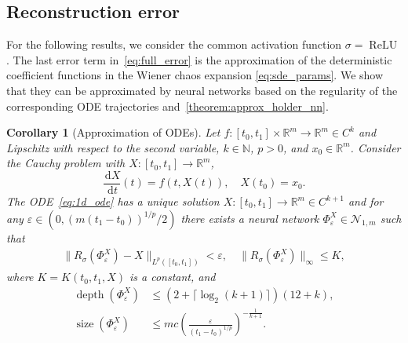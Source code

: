\documentclass[12pt]{article}
\newtheorem{corollary}[theorem]{Corollary}
\theoremstyle{remark}
\theoremstyle{plain}
\numberwithin{equation}{section}
\newcommand{\dd}{\ensuremath{\,\mathrm d}}
\newcommand{\N}{\mathbb{N}}
\newcommand{\R}{\mathbb{R}}
\DeclareMathOperator{\Size}{size}
\DeclareMathOperator{\Depth}{depth}
\DeclareMathOperator{\ReLU}{ReLU}
\begin{document}
\subsection{Reconstruction error}
\label{sec:reconstruction error}

For the following results, we consider the common activation function $\sigma=\ReLU$.
The last error term in~\cref{eq:full_error} is the approximation of the deterministic coefficient functions in the Wiener chaos expansion \cref{eq:sde_params}.
We show that they can be approximated by neural networks based on the regularity of the corresponding ODE trajectories and~\cref{theorem:approx_holder_nn}.
\begin{corollary}[{Approximation of ODEs}]\label{corollary:approx_1d_odes}
    Let $f : [t_0,t_1] \times \R^m \to \R^m \in C^k$ and Lipschitz with respect to the second variable, $k \in \N$, $p > 0$, and $x_0 \in \R^m$.
    Consider the Cauchy problem with $X : [t_0, t_1] \to \R^m$,
    \begin{equation}
        \frac{\dd X}{\dd t}(t) = f(t, X(t)),\quad X(t_0)=x_0.\label{eq:1d_ode}
    \end{equation}
    The ODE~\cref{eq:1d_ode} has a unique solution $X : [t_0,t_1] \to \R^m \in C^{k+1}$ and for any $\varepsilon \in (0,(m(t_1-t_0))^{1/p}/2)$ there exists a neural network $\Phi_\varepsilon^X \in \mathcal N_{1,m}$ such that
    \begin{align*}
        \|R_\sigma(\Phi_\varepsilon^X) - X\|_{L^p([t_0,t_1])} < \varepsilon,\quad
        \|R_\sigma(\Phi_\varepsilon^X)\|_\infty \leq K,
    \end{align*}
    where $K = K(t_0, t_1, X)$ is a constant, and
    \begin{align*}
        \Depth(\Phi_\varepsilon^X) &\leq (2+\lceil \log_2(k+1)\rceil)(12+k),\\
        \Size(\Phi_\varepsilon^X) &\leq mc\left(\frac{\varepsilon}{(t_1-t_0)^{1/p}}\right)^{-\frac{1}{k+1}}.
    \end{align*}
\end{corollary}
\end{document}
